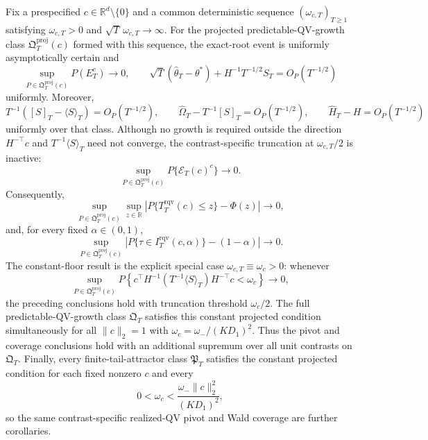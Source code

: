 Fix a prespecified \(c\in\mathbb R^d\setminus\{0\}\) and a common deterministic sequence \((\omega_{c,T})_{T\ge1}\) satisfying \(\omega_{c,T}>0\) and \(\sqrt T\,\omega_{c,T}\to\infty\). For the projected predictable-QV-growth class \(\mathfrak Q_T^{\mathrm{proj}}(c)\) formed with this sequence, the exact-root event is uniformly asymptotically certain and
\[
 \sup_{P\in\mathfrak Q_T^{\mathrm{proj}}(c)}P(E_T^c)\longrightarrow0,
 \qquad
 \sqrt T(\widehat\theta_T-\theta^*)+H^{-1}T^{-1/2}S_T
 =O_P(T^{-1/2})
\]
uniformly. Moreover,
\[
 T^{-1}([S]_T-\langle S\rangle_T)=O_P(T^{-1/2}),\qquad
 \widehat\Omega_T-T^{-1}[S]_T=O_P(T^{-1/2}),\qquad
 \widehat H_T-H=O_P(T^{-1/2})
\]
uniformly over that class. Although no growth is required outside the direction \(H^{-\top}c\) and \(T^{-1}\langle S\rangle_T\) need not converge, the contrast-specific truncation at \(\omega_{c,T}/2\) is inactive:
\[
 \sup_{P\in\mathfrak Q_T^{\mathrm{proj}}(c)}P\{\mathcal E_T(c)^c\}
 \longrightarrow0.
\]
Consequently,
\[
 \sup_{P\in\mathfrak Q_T^{\mathrm{proj}}(c)}\sup_{z\in\mathbb R}
 \left|P\{T_T^{\mathrm{rqv}}(c)\le z\}-\Phi(z)\right|
 \longrightarrow0,
\]
and, for every fixed \(\alpha\in(0,1)\),
\[
 \sup_{P\in\mathfrak Q_T^{\mathrm{proj}}(c)}
 \left|P\{\tau\in I_T^{\mathrm{rqv}}(c,\alpha)\}-(1-\alpha)\right|
 \longrightarrow0.
\]
The constant-floor result is the explicit special case \(\omega_{c,T}\equiv\omega_c>0\): whenever
\[
 \sup_{P\in\mathfrak Q_T^{\mathrm{proj}}(c)}
 P\!\left\{c^\top H^{-1}(T^{-1}\langle S\rangle_T)H^{-\top}c<\omega_c\right\}
 \longrightarrow0,
\]
the preceding conclusions hold with truncation threshold \(\omega_c/2\). The full predictable-QV-growth class \(\mathfrak Q_T\) satisfies this constant projected condition simultaneously for all \(\|c\|_2=1\) with \(\omega_c=\omega_-/(KD_1)^2\). Thus the pivot and coverage conclusions hold with an additional supremum over all unit contrasts on \(\mathfrak Q_T\). Finally, every finite-tail-attractor class \(\mathfrak P_T\) satisfies the constant projected condition for each fixed nonzero \(c\) and every
\[
 0<\omega_c<\frac{\omega_-\|c\|_2^2}{(KD_1)^2},
\]
so the same contrast-specific realized-QV pivot and Wald coverage are further corollaries.